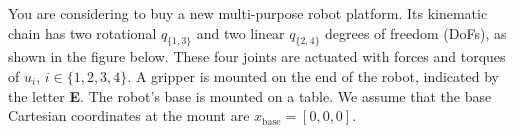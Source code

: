 You are considering to buy a new multi-purpose robot platform. Its kinematic chain has two rotational $q_{\{1,3\}}$ and two linear $q_{\{2,4\}}$ degrees of freedom (DoFs), as shown in the figure below. These four joints are actuated with forces and torques of $u_i$, $i\in\{1,2,3,4\}$. A gripper is mounted on the end of the robot, indicated by the letter \textbf{E}. The robot's base is mounted on a table. We assume that the base Cartesian coordinates at the mount are $x_\textrm{base}=[0,0,0]$.  

\begin{center}
\end{center}


